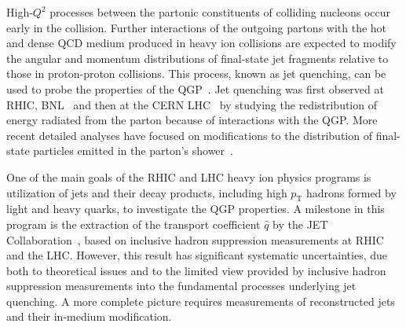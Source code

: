 High-$Q^2$ processes between the partonic constituents of colliding nucleons occur early in the collision. Further interactions of the outgoing partons with the hot and dense QCD medium produced in heavy ion collisions are expected to modify the angular and momentum distributions of final-state jet fragments relative to those in proton-proton collisions. This process, known as jet quenching, can be used to probe the properties of the QGP~\cite{Bjorken:1982tu,Gyulassy:1990ye,Baier:1994bd,Zakharov:2018rst,Gyulassy:1999zd,Wiedemann:2009sh}. Jet quenching was first observed at RHIC, BNL~\cite{Adcox:2001jp,Adler:2003qi,Adler:2002xw,Adler:2002tq,Adams:2003kv,Adams:2003im,Adams:2006yt,Arsene:2003yk,Back:2003qr,Adamczyk:2016fqm,Adamczyk:2017yhe} and then at the CERN LHC~\cite{Aamodt:2010jd,Aamodt:2011vg,Aad:2015wga,CMS:2012aa,Aad:2010bu,Chatrchyan:2012nia,Aad:2012vca,Abelev:2013kqa,Adam:2015ewa,Khachatryan:2016odn,Adam:2015doa} by studying the redistribution of energy radiated from the parton because of interactions with the QGP. More recent detailed analyses have focused on modifications to the distribution of final-state particles emitted in the parton's shower~\cite{Chatrchyan:2013kwa,Chatrchyan:2014ava,Aaboud:2017bzv,Acharya:2017goa,Acharya:2018uvf,Sirunyan:2017bsd,Sirunyan:2018gct}.

One of the main goals of the RHIC and LHC heavy ion physics programs is utilization of jets and their decay products, including high $p_{\mathrm{T}}$ hadrons formed by light and heavy quarks, to investigate the QGP properties. A milestone in this program is the extraction of the transport coefficient $\hat q $ by the JET Collaboration~\cite{Burke:2013yra}, based on inclusive hadron suppression measurements at RHIC and the LHC. However, this result has significant systematic uncertainties, due both to theoretical issues and to the limited view provided by inclusive hadron suppression measurements into the fundamental processes underlying jet quenching. A more complete picture requires measurements of reconstructed jets and their in-medium modification. 

